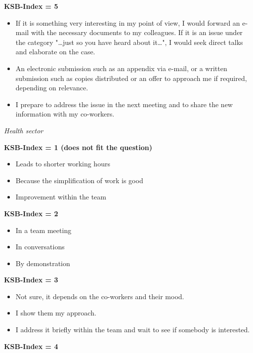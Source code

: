 \documentclass[twocolumn, serif, empirical, authordate]{jote-article}
\begin{document}
\textbf{KSB-Index = 5}

\begin{itemize} \item If it is something very interesting in my point of view, I would forward an e-mail with the necessary documents to my colleagues. If it is an issue under the category "\ldots just so you have heard about it\ldots", I would seek direct talks and elaborate on the case.
\item An electronic submission such as an appendix via e-mail, or a written submission such as copies distributed or an offer to approach me if required, depending on relevance.
\item I prepare to address the issue in the next meeting and to share the new information with my co-workers.
\end{itemize} 
\emph{Health sector} 

\textbf{KSB-Index = 1 (does not fit the question)}

\begin{itemize} \item Leads to shorter working hours \item Because the simplification of work is good \item Improvement within the team \end{itemize} 

\textbf{KSB-Index = 2}

\begin{itemize} \item In a team meeting \item In conversations \item By demonstration \end{itemize} 

\textbf{KSB-Index = 3}

\begin{itemize} \item Not sure, it depends on the co-workers and their mood.
\item I show them my approach.
\item I address it briefly within the team and wait to see if somebody is interested.
\end{itemize} 

\textbf{KSB-Index = 4}
\end{document}
